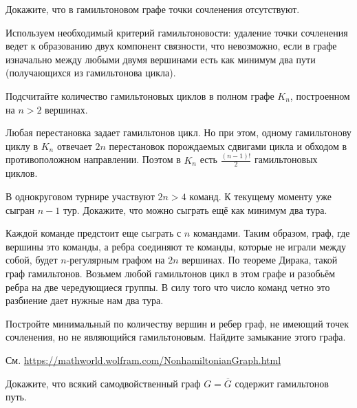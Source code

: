 \documentclass[a4paper,12pt,twoside]{article}
\begin{document}
\begin{?}
    Докажите, что в гамильтоновом графе точки сочленения отсутствуют.
\end{?}
\begin{solution}{}
    Используем необходимый критерий гамильтоновости: удаление точки сочленения ведет к образованию двух компонент связности, что невозможно, если в графе изначально между любыми двумя вершинами есть как минимум два пути (получающихся из гамильтонова цикла).
\end{solution}
\begin{?}
    Подсчитайте количество гамильтоновых циклов в полном графе $K_n$, построенном на $n > 2$ вершинах.
\end{?}
\begin{solution}{}
    Любая перестановка задает гамильтонов цикл. Но при этом, одному гамильтонову циклу в \(K_n\) отвечает \(2n\) перестановок порождаемых сдвигами цикла и обходом в противоположном направлении. Поэтом в \(K_n\) есть \(\frac{(n-1)!}{2}\) гамильтоновых циклов.
\end{solution}
\begin{?}
    В однокруговом турнире участвуют $2n > 4$ команд. К текущему моменту уже сыгран $n - 1$ тур. Докажите, что можно сыграть ещё как минимум два тура.
\end{?}
\begin{solution}{}
    Каждой команде предстоит еще сыграть с \(n\) командами. Таким образом, граф, где вершины это команды, а ребра соединяют те команды, которые не играли между собой, будет \(n\)-регулярным графом на \(2n\) вершинах. По теореме Дирака, такой граф гамильтонов. Возьмем любой гамильтонов цикл в этом графе и разобьём ребра на две чередующиеся группы. В силу того что число команд четно это разбиение дает нужные нам два тура.
\end{solution}
\begin{?}
    Постройте минимальный по количеству вершин и ребер граф, не имеющий точек сочленения, но не являющийся гамильтоновым. Найдите замыкание этого графа.
\end{?}
\begin{solution}{}
    См{.} \url{https://mathworld.wolfram.com/NonhamiltonianGraph.html}
\end{solution}
\begin{?}
    Докажите, что всякий самодвойственный граф \(G = \overline{G}\) содержит гамильтонов путь.
\end{?}
\end{document}
